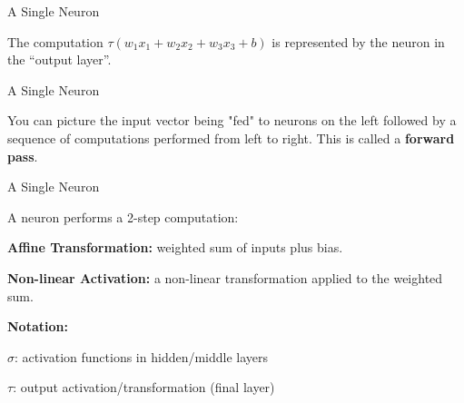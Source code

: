 \documentclass[11pt,compress,t,notes=noshow, xcolor=table]{beamer}
\begin{document}
\begin{framei} {A Single Neuron}
\item The computation $\tau(w_1x_1 + w_2x_2 + w_3x_3 + b)$ is represented by the neuron in the \enquote{output layer}.
\end{framei}

\begin{framei} {A Single Neuron}
\item %
You can picture the input vector being "fed" to neurons on the left followed by a sequence of computations performed from left to right. This is called a \textbf{forward pass}.
\end{framei}

\begin{framei} {A Single Neuron}
\item A neuron performs a 2-step computation:
\item \textbf{Affine Transformation:} weighted sum of inputs plus bias.
\item \textbf{Non-linear Activation:} a non-linear transformation applied to the weighted sum.
\vfill
\item \textbf{Notation:}
\item $\sigma$: activation functions in hidden/middle layers
\item $\tau$: output activation/transformation (final layer)
\end{framei}

\end{document}
